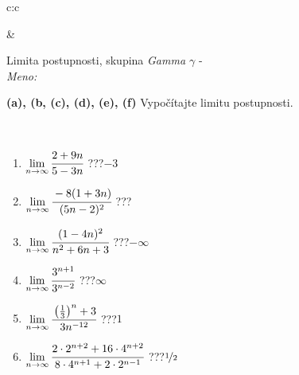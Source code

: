 \documentclass[10pt]{report}
\begin{document}
\begin{tabular}{c:c}
\begin{minipage}[c][104.5mm][t]{0.5\linewidth}
\begin{center}
\begin{minipage}{0.20\linewidth}
\begin{center}
\end{center}
\end{minipage}
\end{center}
\end{minipage}
&
\begin{minipage}[c][104.5mm][t]{0.5\linewidth}
\begin{center}
\vspace{5mm}
{\huge Limita postupnosti, skupina \textit{Gamma $\gamma$} -}\\[5mm]
\textit{Meno:}\phantom{xxxxxxxxxxxxxxxxxxxxxxxxxxxxxxxxxxxxxxxxxxxxxxxxxxxxxxxxxxxxxxxxx}\\[5mm]
\begin{minipage}{0.95\linewidth}
\begin{center}
{
\textbf{(a), (b, (c), (d), (e), (f)} Vypočítajte limitu postupnosti. \\[-1mm]
\phantom{x}
}
\end{center}
\end{minipage}
\\[1mm]
\begin{minipage}{0.79\linewidth}
\begin{center}
\begin{varwidth}{\linewidth}
\setlength{\itemsep}{0pt}
\begin{enumerate}
\normalsize
\item $\lim\limits_{n\to\infty}\cfrac{2+9n}{5-3n}$\quad \dotfill\; ???\;\dotfill \quad $-3$
\item $\lim\limits_{n\to\infty}\cfrac{-8(1+3n)}{(5n-2)^2}$\quad \dotfill\; ???\;\dotfill {}
\item $\lim\limits_{n\to\infty}\cfrac{(1-4n)^2}{n^2+6n+3}$\quad \dotfill\; ???\;\dotfill \quad $-\infty$
\item $\lim\limits_{n\to\infty}\cfrac{3^{n+1}}{3^{n-2}}$\quad \dotfill\; ???\;\dotfill \quad $\infty$
\item $\lim\limits_{n\to\infty}\cfrac{\left(\frac{1}{3}\right)^n +3}{3n^{-12}}$\quad \dotfill\; ???\;\dotfill \quad $1$
\item $\lim\limits_{n\to\infty}\cfrac{2\cdot 2^{n+2}+16\cdot 4^{n+2}}{8\cdot 4^{n+1}+2\cdot 2^{n-1}}$\quad \dotfill\; ???\;\dotfill \quad $\nicefrac{1}{2}$
\end{enumerate}
\end{varwidth}
\end{center}
\end{minipage}
\begin{minipage}{0.20\linewidth}
\begin{center}

\end{center}
\end{minipage}
\end{center}
\end{minipage}
\end{tabular}
\end{document}
